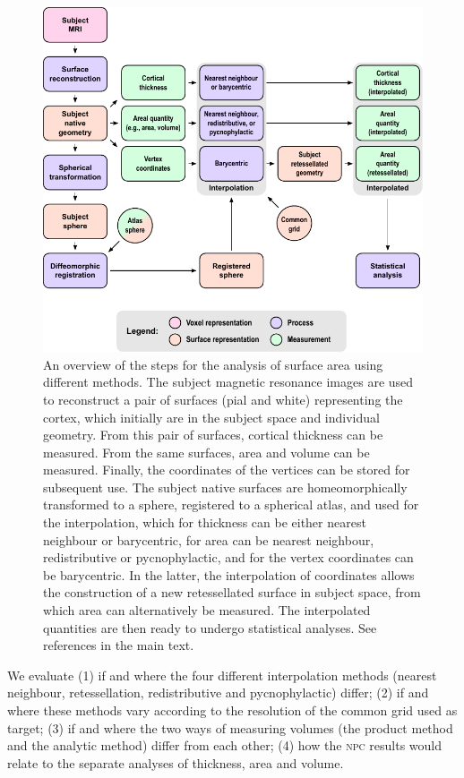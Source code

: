 \begin{figure}[p!]
\begin{center}
\hspace*{-.2cm}
\includegraphics{figures/flowchart.pdf}
\caption{An overview of the steps for the analysis of surface area using different methods. The subject magnetic resonance images are used to reconstruct a pair of surfaces (pial and white) representing the cortex, which initially are in the subject space and individual geometry. From this pair of surfaces, cortical thickness can be measured. From the same surfaces, area and volume can be measured. Finally, the coordinates of the vertices can be stored for subsequent use. The subject native surfaces are homeomorphically transformed to a sphere, registered to a spherical atlas, and used for the interpolation, which for thickness can be either nearest neighbour or barycentric, for area can be nearest neighbour, redistributive or pycnophylactic, and for the vertex coordinates can be barycentric. In the latter, the interpolation of coordinates allows the construction of a new retessellated surface in subject space, from which area can alternatively be measured. The interpolated quantities are then ready to undergo statistical analyses. See references in the main text.}
\label{fig:flowchart}
\end{center}
\end{figure}

We evaluate (1) if and where the four different interpolation methods (nearest neighbour, retessellation, redistributive and pycnophylactic) differ; (2) if and where these methods vary according to the resolution of the common grid used as target; (3) if and where the two ways of measuring volumes (the product method and the analytic method) differ from each other; (4) how the \textsc{npc} results would relate to the separate analyses of thickness, area and volume.

